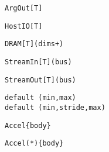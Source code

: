 \begin{table*}
\newsavebox{\argOutSyntax}
\begin{lrbox}{\argOutSyntax}
\begin{lstlisting}[language=SpatialTable]
ArgOut[T]
\end{lstlisting}
\end{lrbox}

\newsavebox{\hostIOSyntax}
\begin{lrbox}{\hostIOSyntax}
\begin{lstlisting}[language=SpatialTable]
HostIO[T]
\end{lstlisting}
\end{lrbox}

\newsavebox{\dramSyntax}
\begin{lrbox}{\dramSyntax}
\begin{lstlisting}[language=SpatialTable]
DRAM[T](dims+)
\end{lstlisting}
\end{lrbox}

\newsavebox{\streamInSyntax}
\begin{lrbox}{\streamInSyntax}
\begin{lstlisting}[language=SpatialTable]
StreamIn[T](bus)
\end{lstlisting}
\end{lrbox}

\newsavebox{\streamOutSyntax}
\begin{lrbox}{\streamOutSyntax}
\begin{lstlisting}[language=SpatialTable]
StreamOut[T](bus)
\end{lstlisting}
\end{lrbox}

\newsavebox{\parameterSyntax}
\begin{lrbox}{\parameterSyntax}
\begin{lstlisting}[language=SpatialTable]
default (min,max)
default (min,stride,max)
\end{lstlisting}
\end{lrbox}

\newsavebox{\accelSyntax}
\begin{lrbox}{\accelSyntax}
\begin{lstlisting}[language=SpatialTable]
Accel{body}
\end{lstlisting}
\end{lrbox}

\newsavebox{\accelStarSyntax}
\begin{lrbox}{\accelStarSyntax}
\begin{lstlisting}[language=SpatialTable]
Accel(*){body}
\end{lstlisting}
\end{lrbox}


\end{table*}
